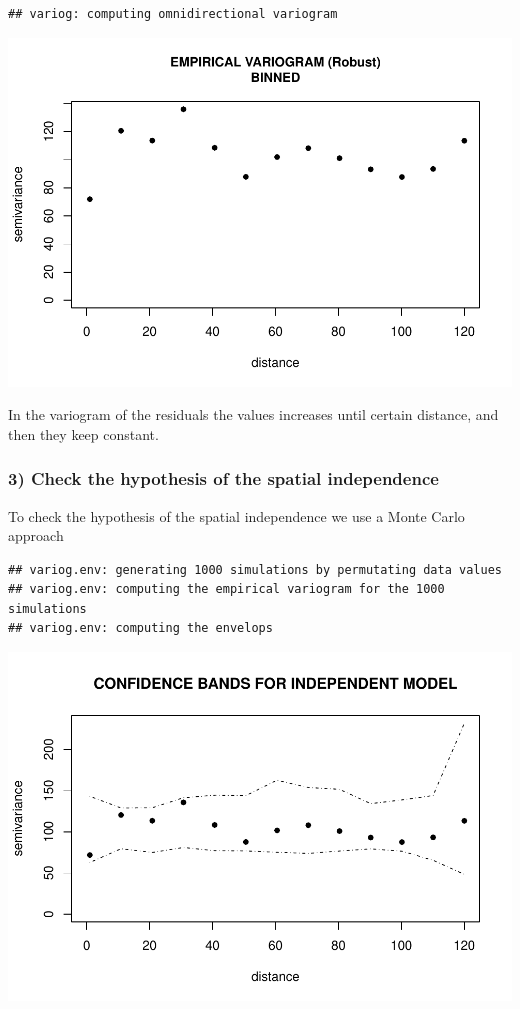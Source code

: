 \documentclass[
]{article}
\begin{document}
\begin{verbatim}
## variog: computing omnidirectional variogram
\end{verbatim}

\includegraphics{Assignment_1_files/figure-latex/unnamed-chunk-19-1.pdf}

In the variogram of the residuals the values increases until certain
distance, and then they keep constant.

\hypertarget{check-the-hypothesis-of-the-spatial-independence}{%
\subsubsection{3) Check the hypothesis of the spatial
independence}\label{check-the-hypothesis-of-the-spatial-independence}}

To check the hypothesis of the spatial independence we use a Monte Carlo
approach

\begin{verbatim}
## variog.env: generating 1000 simulations by permutating data values
## variog.env: computing the empirical variogram for the 1000 simulations
## variog.env: computing the envelops
\end{verbatim}

\includegraphics{Assignment_1_files/figure-latex/unnamed-chunk-20-1.pdf}
\end{document}
